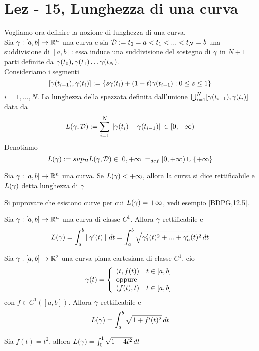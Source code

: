 \section{Lez - 15, Lunghezza di una curva}
Vogliamo ora definire la nozione di lunghezza di una curva.\\
Sia $\gamma:[a,b]\to\mathbb{R}^n$ una curva e sia $\mathcal{D} := {t_0 = a < t_1 < ... < t_N = b}$ 
una suddivisione di $[a,b]$: essa induce una suddivisione del sostegno di 
$\gamma$ in $N+1$ parti definite da 
$\gamma(t_0),\gamma(t_1)\dots \gamma(t_N)$. \\
Consideriamo i segmenti
$$[\gamma(t_{i-1}),\gamma(t_i)] := \{s\gamma(t_i)+(1-t)\gamma(t_{i-1}) : 0 \leq s \leq 1\}$$
$i = 1,...,N$. La lunghezza della spezzata definita dall'unione 
$\bigcup_{i=1}^{N} [\gamma(t_{i-1}),\gamma(t_i)]$ \ace data da 
$$L(\gamma,\mathcal{D}) := \sum_{i=1}^{N} \left\lVert\gamma(t_i)-\gamma(t_{i-1})\right\rVert \in [0,+\infty)$$
Denotiamo 
$$L(\gamma) := sup_{\mathcal{D}} L(\gamma,\mathcal{D}) \in [0,+\infty] =_{def} [0,+\infty) \cup \{+\infty\}$$
\begin{definition}
  Sia $\gamma:[a,b]\to\mathbb{R}^n$ una curva. Se $L(\gamma) < +\infty$, allora la curva si dice
  \underline{rettificabile} e $L(\gamma)$ \ace detta \underline{lunghezza} di $\gamma$
\end{definition}
\begin{osservazione}
  Si pu\aco provare che esistono curve per cui $L(\gamma) = +\infty$, vedi esempio [BDPG,12.5].
\end{osservazione}
\begin{theorem}
  \label{lunghezzacurva}
  Sia $\gamma:[a,b]\to\mathbb{R}^n$ una curva di classe $C^1$. Allora $\gamma$ \ace rettificabile e 
  $$L(\gamma)= \int_{a}^{b} \left\lVert\gamma'(t)\right\rVert \,dt = \int_{a}^{b} \sqrt{\gamma_1'(t)^2 + ... + \gamma_n'(t)^2}\,dt$$
\end{theorem}
\begin{corollary}
  Sia $\gamma:[a,b]\to\mathbb{R}^2$ una curva piana cartesiana di classe $C^1$, cio\ace
  $$\gamma(t)=\left\{\begin{array}{ll}
    (t,f(t)) & t \in [a,b] \\
    \text{oppure} \\
    (f(t),t) & t \in [a,b]
  \end{array}\right.$$
  con $f\in C^1([a,b])$. Allora $\gamma$ \ace rettificabile e 
  $$L(\gamma) = \int_{a}^{b} \sqrt{1+f'(t)^2} \,dt$$
  \begin{example}
    Sia $f(t)=t^2$, allora $L(\gamma) = \int_{0}^{1} \sqrt{1+4t^2} \,dt$
  \end{example}
\end{corollary}

